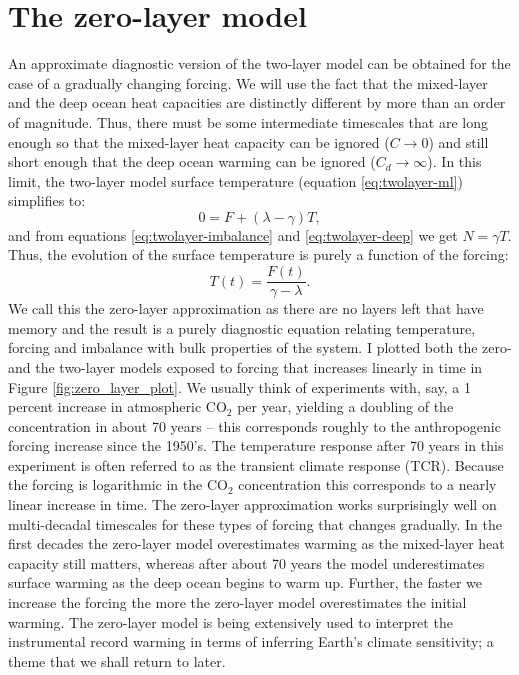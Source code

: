 \documentclass[12pt]{book}
\begin{document}
\section{The zero-layer model}
\label{sec:zero-layer}
An approximate diagnostic version of the two-layer model can be obtained for the case of a gradually changing forcing. We will use the fact that the mixed-layer and the deep ocean heat capacities are distinctly different by more than an order of magnitude. Thus, there must be some intermediate timescales that are long enough so that the mixed-layer heat capacity can be ignored ($C\rightarrow 0$) and still short enough that the deep ocean warming can be ignored ($C_d \rightarrow \infty$). In this limit, the two-layer model surface temperature (equation \ref{eq:twolayer-ml}) simplifies to:
\begin{equation}
0 = F + \left(\lambda - \gamma \right)T,
\label{eq:zero-layer}
\end{equation}
and from equations \ref{eq:twolayer-imbalance} and \ref{eq:twolayer-deep} we get $N=\gamma T$. Thus, the evolution of the surface temperature is purely a function of the forcing:
$$T(t)=\frac{F(t)}{\gamma-\lambda}.$$
We call this the zero-layer approximation as there are no layers left that have memory and the result is a purely diagnostic equation relating temperature, forcing and imbalance with bulk properties of the system. I plotted both the zero- and the two-layer models exposed to forcing that increases linearly in time in Figure \ref{fig:zero_layer_plot}. We usually think of experiments with, say, a 1 percent increase in atmospheric CO$_2$ per year, yielding a doubling of the concentration in about 70 years -- this corresponds roughly to the anthropogenic forcing increase since the 1950's. The temperature response after 70 years in this experiment is often referred to as the transient climate response (TCR). Because the forcing is logarithmic in the CO$_2$ concentration this corresponds to a nearly linear increase in time. The zero-layer approximation works surprisingly well on multi-decadal timescales for these types of forcing that changes gradually. In the first decades the zero-layer model overestimates warming as the mixed-layer heat capacity still matters, whereas after about 70 years the model underestimates surface warming as the deep ocean begins to warm up. Further, the faster we increase the forcing the more the zero-layer model overestimates the initial warming.
The zero-layer model is being extensively used to interpret the instrumental record warming in terms of inferring Earth's climate sensitivity; a theme that we shall return to later.
\end{document}
